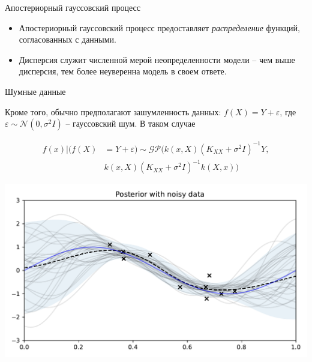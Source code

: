 \documentclass[fullscreen=true, bookmarks=true, hyperref={pdfencoding=unicode}]{beamer}
\begin{document}
\begin{frame}{Апостериорный гауссовский процесс}

    \begin{itemize}
        \item<1-> Апостериорный гауссовский процесс предоставляет \textit{распределение} функций, согласованных с данными. %

        \item<2-> Дисперсия служит численной мерой неопределенности модели -- чем выше дисперсия, тем более неуверенна модель в своем ответе. %

    \end{itemize}

\end{frame}

\begin{frame}{Шумные данные}

    Кроме того, обычно предполагают зашумленность данных: $f(X) = Y + \varepsilon$, где $\varepsilon \sim \mathcal{N}(0, \sigma^2 I)$ -- гауссовский шум. В таком случае

    \begin{align*}
      f(x) | (f(X) &= Y + \varepsilon) \sim \mathcal{GP}\Big(k(x, X)(K_{XX} + \sigma^2 I)^{-1}Y, \\
      &k(x, X) (K_{XX} + \sigma^2 I)^{-1} k(X, x) \Big)
    \end{align*}

\end{frame}

\begin{frame}{}

    \centerline{\includegraphics[width=\textwidth]{04_gpr_posterior_noisy.pdf}}

\end{frame}
\end{document}
